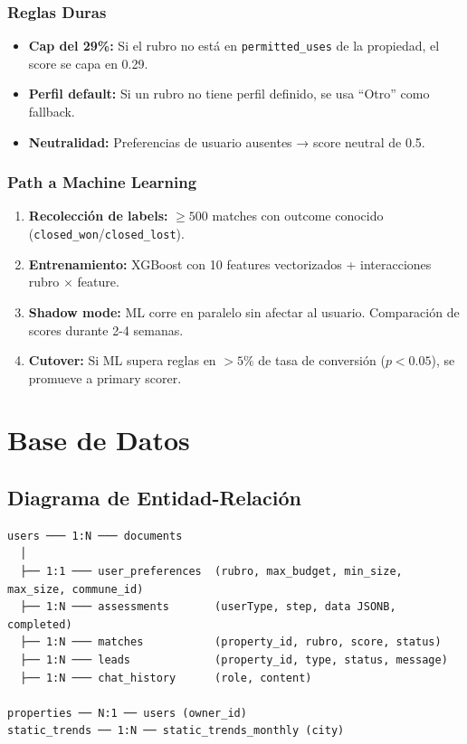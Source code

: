 \documentclass[11pt,a4paper]{article}
\begin{document}
\subsubsection{Reglas Duras}

\begin{itemize}
    \item \textbf{Cap del 29\%:} Si el rubro no está en \texttt{permitted\_uses} de la propiedad, el score se capa en 0.29.
    \item \textbf{Perfil default:} Si un rubro no tiene perfil definido, se usa ``Otro'' como fallback.
    \item \textbf{Neutralidad:} Preferencias de usuario ausentes → score neutral de 0.5.
\end{itemize}

\subsubsection{Path a Machine Learning}

\begin{enumerate}
    \item \textbf{Recolección de labels:} $\geq 500$ matches con outcome conocido (\texttt{closed\_won}/\texttt{closed\_lost}).
    \item \textbf{Entrenamiento:} XGBoost con 10 features vectorizados + interacciones rubro $\times$ feature.
    \item \textbf{Shadow mode:} ML corre en paralelo sin afectar al usuario. Comparación de scores durante 2-4 semanas.
    \item \textbf{Cutover:} Si ML supera reglas en $> 5\%$ de tasa de conversión ($p < 0.05$), se promueve a primary scorer.
\end{enumerate}

\section{Base de Datos}

\subsection{Diagrama de Entidad-Relación}

\begin{verbatim}
users ─── 1:N ─── documents
  │
  ├── 1:1 ─── user_preferences  (rubro, max_budget, min_size, max_size, commune_id)
  ├── 1:N ─── assessments       (userType, step, data JSONB, completed)
  ├── 1:N ─── matches           (property_id, rubro, score, status)
  ├── 1:N ─── leads             (property_id, type, status, message)
  ├── 1:N ─── chat_history      (role, content)

properties ── N:1 ── users (owner_id)
static_trends ── 1:N ── static_trends_monthly (city)
\end{verbatim}
\end{document}
